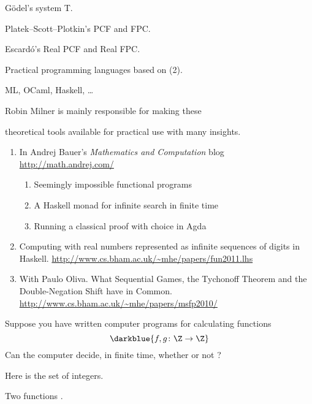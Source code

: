 \documentclass%
[%
Screen4to3,
]{foils}
\begin{document}


 G\"odel's system T.

 Platek--Scott--Plotkin's PCF and FPC.

 Escard\'o's Real PCF and Real FPC.

 Practical programming languages based on (2).

\quad ML, OCaml, Haskell, \dots

\qquad Robin Milner is mainly responsible for making these

\qquad theoretical tools available for practical use with many insights.


\begin{enumerate}
\item In Andrej Bauer's \emph{Mathematics and Computation} blog \url{http://math.andrej.com/}
\begin{enumerate}
\item Seemingly impossible functional programs
\item A Haskell monad for infinite search in finite time
\item Running a classical proof with choice in Agda
\end{enumerate}
\item Computing with real numbers represented as infinite sequences of digits in Haskell. \url{http://www.cs.bham.ac.uk/~mhe/papers/fun2011.lhs}
\item With Paulo Oliva. What Sequential Games, the Tychonoff Theorem and the Double-Negation Shift have in Common. 
\url{http://www.cs.bham.ac.uk/~mhe/papers/msfp2010/}
\end{enumerate}




Suppose you have written computer programs for calculating functions
\[
\darkblue{f, g \colon \Z \to \Z}
\]
Can the computer decide, in finite time, whether or not ?

\vfill

Here \darkblue{$\Z$} is the set of integers. 

\vfill
{} Two functions .
\end{document}
